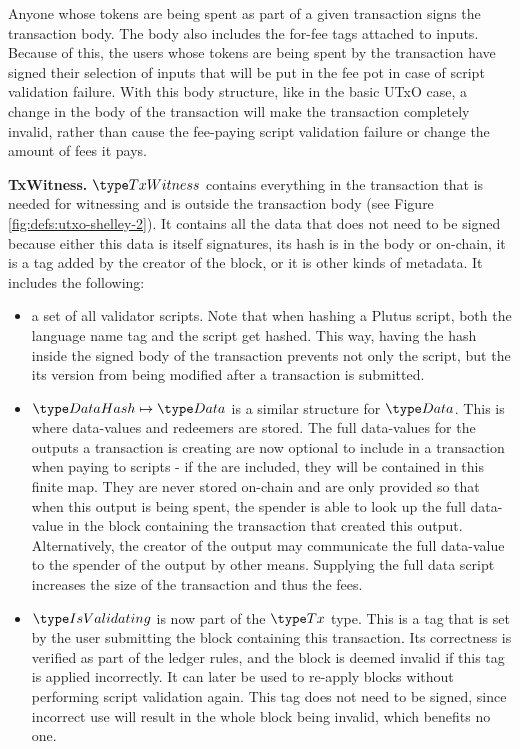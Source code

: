 Anyone whose tokens are being spent as part of a given transaction
signs the transaction body. The body also includes the for-fee tags attached to inputs.
Because of this, the users whose tokens are being spent by the transaction have
signed their selection of
inputs that will be put in the fee pot in case of script validation failure.
With this body structure, like in the basic UTxO case, a change in the body of the transaction
will make the transaction completely invalid, rather than cause the fee-paying script validation
failure or change the amount of fees it pays.

\textbf{TxWitness.}
$\TxWitness$ contains everything in the transaction that is needed for witnessing
and is outside the transaction body (see Figure \ref{fig:defs:utxo-shelley-2}).
It contains all the data that does not need to be signed because either
this data is itself signatures, its hash is in the body or on-chain, it is a tag
added by the creator of the block, or it is other kinds of metadata. It includes
the following:

\begin{itemize}
  \item a set of all validator scripts.
  Note that when hashing a Plutus script, both the language name tag and the script get
  hashed. This way, having the hash inside the signed body of the transaction
  prevents not only the script, but the its version from being modified
  after a transaction is submitted.
  \item $\DataHash \mapsto \Data$ is a similar structure for $\Data$.
  This is where data-values and redeemers are stored.
  The full data-values for the outputs a transaction is creating
  are now optional to include in a transaction when
  paying to scripts - if the are included, they will be contained in
  this finite map. They are never
  stored on-chain and are only provided so that when this output is being spent,
  the spender is
  able to look up the full data-value in the block containing the transaction
  that created this output. Alternatively, the creator of the output
  may communicate the full data-value to the spender of the output by
  other means.
  Supplying the full data script increases the size of the transaction and
  thus the fees.
  \item $\IsValidating$ is now part of the $\Tx$ type. This is a tag that is
  set by the user submitting the block containing this transaction.
  Its correctness is verified as part of the ledger rules, and the block is
  deemed invalid if this tag is applied incorrectly.
  It can later be used to re-apply blocks without performing script validation
  again. This tag does not need to be signed, since incorrect use will result
  in the whole block being invalid, which benefits no one.
\end{itemize}

